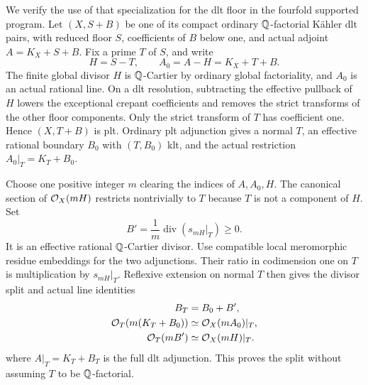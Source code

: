We verify the use of that specialization for the dlt floor in the
fourfold supported program.  Let \((X,S+B)\) be one of its compact
ordinary \(\mathbb Q\)-factorial K\"ahler dlt pairs, with reduced floor
\(S\), coefficients of \(B\) below one, and actual adjoint
\(A=K_X+S+B\).  Fix a prime \(T\) of \(S\), and write
\[
 H=S-T,\qquad A_0=A-H=K_X+T+B.
\]
The finite global divisor \(H\) is \(\mathbb Q\)-Cartier by ordinary global
factoriality, and \(A_0\) is an actual rational line.  On a dlt
resolution, subtracting the effective pullback of \(H\) lowers the
exceptional crepant coefficients and removes the strict transforms of
the other floor components.  Only the strict transform of \(T\) has
coefficient one.  Hence \((X,T+B)\) is plt.  Ordinary plt adjunction
\cite[Lemma~5.3]{DasHacon2024OnMMP} gives a normal \(T\), an effective
rational boundary \(B_0\) with \((T,B_0)\) klt, and the actual
restriction \(A_0|_T=K_T+B_0\).

Choose one positive integer \(m\) clearing the indices of \(A,A_0,H\).
The canonical section of \(\mathcal O_X(mH)\) restricts nontrivially to \(T\)
because \(T\) is not a component of \(H\).  Set
\[
 B'=\frac1m\operatorname{div}(s_{mH}|_T)\geq0.
\]
It is an effective rational \(\mathbb Q\)-Cartier divisor.  Use compatible
local meromorphic residue embeddings for the two adjunctions.  Their
ratio in codimension one on \(T\) is multiplication by \(s_{mH}|_T\).
Reflexive extension on normal \(T\) then gives the divisor split and
actual line identities
\begin{equation}\label{eq:actual-floor-boundary-split}
 \begin{aligned}
  B_T&=B_0+B',\\
  \mathcal O_T(m(K_T+B_0))&\simeq\mathcal O_X(mA_0)|_T,\\
  \mathcal O_T(mB')&\simeq\mathcal O_X(mH)|_T.
 \end{aligned}
\end{equation}
where \(A|_T=K_T+B_T\) is the full dlt adjunction.  This proves the
split without assuming \(T\) to be \(\mathbb Q\)-factorial.

